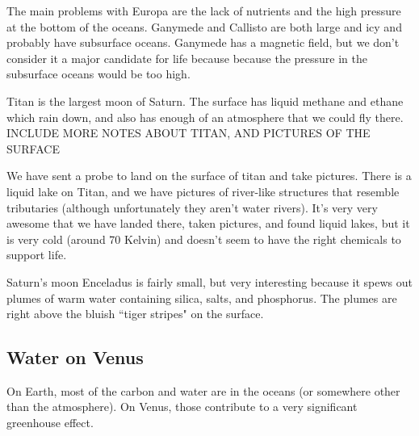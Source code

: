 \documentclass[class=article, crop=false]{standalone}
\begin{document}
\par
The main problems with Europa are the lack of nutrients and the high pressure at the bottom of the oceans.
Ganymede and Callisto are both large and icy and probably have subsurface oceans. Ganymede has a magnetic field, but we don't consider it a major candidate for life because because the pressure in the subsurface oceans would be too high.
\par
Titan is the largest moon of Saturn. The surface has liquid methane and ethane which rain down, and also has enough of an atmosphere that we could fly there. INCLUDE MORE NOTES ABOUT TITAN, AND PICTURES OF THE SURFACE
\par
We have sent a probe to land on the surface of titan and take pictures. There is a liquid lake on Titan, and we have pictures of river-like structures that resemble tributaries (although unfortunately they aren't water rivers). It's very very awesome that we have landed there, taken pictures, and found liquid lakes, but it is very cold (around 70 Kelvin) and doesn't seem to have the right chemicals to support life.
\par
Saturn's moon Enceladus is fairly small, but very interesting because it spews out plumes of warm water containing silica, salts, and phosphorus. The plumes are right above the bluish ``tiger stripes" on the surface.
\subsection{Water on Venus}
On Earth, most of the carbon and water are in the oceans (or somewhere other than the atmosphere). On Venus, those contribute to a very significant greenhouse effect.
\end{document}
